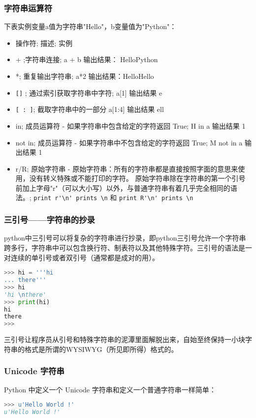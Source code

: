 \subsubsection{字符串运算符}
下表实例变量a值为字符串"Hello"，b变量值为"Python"：

\begin{itemize}
\item 操作符;	描述;	实例
\item +	;字符串连接;	a + b 输出结果： HelloPython
\item *;	重复输出字符串;	a*2 输出结果：HelloHello
\item \verb|[]|	; 通过索引获取字符串中字符;	a[1] 输出结果 e
\item \verb|[ : ]|; 	截取字符串中的一部分	a[1:4] 输出结果 ell
\item in;	成员运算符 - 如果字符串中包含给定的字符返回 True;	H in a 输出结果 1
\item not in;	成员运算符 - 如果字符串中不包含给定的字符返回 True;	M not in a 输出结果 1
\item r/R;	原始字符串 - 原始字符串：所有的字符串都是直接按照字面的意思来使用，没有转义特殊或不能打印的字符。 原始字符串除在字符串的第一个引号前加上字母"r"（可以大小写）以外，与普通字符串有着几乎完全相同的语法。;	\verb|print r'\n' prints \n| 和 \verb|print R'\n' prints \n|
\end{itemize}



\subsubsection{三引号——字符串的抄录}
python中三引号可以将复杂的字符串进行抄录，即python三引号允许一个字符串跨多行，字符串中可以包含换行符、制表符以及其他特殊字符。三引号的语法是一对连续的单引号或者双引号（通常都是成对的用）。
\begin{lstlisting}[language=Python]
>>> hi = '''hi 
... there'''
>>> hi
'hi \nthere'
>>> print(hi)
hi 
there
>>> 
\end{lstlisting}

三引号让程序员从引号和特殊字符串的泥潭里面解脱出来，自始至终保持一小块字符串的格式是所谓的WYSIWYG（所见即所得）格式的。


\subsubsection{Unicode 字符串}
Python 中定义一个 Unicode 字符串和定义一个普通字符串一样简单：
\begin{lstlisting}[language=Python]
>>> u'Hello World !'
u'Hello World !'
\end{lstlisting}

